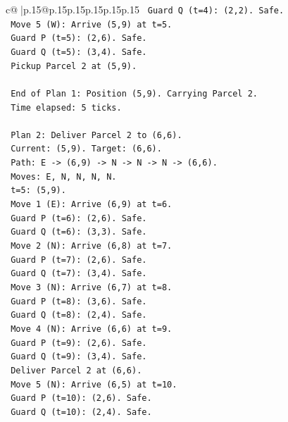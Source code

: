 \documentclass{article}
\begin{document}
{\begin{supertabular}{c@{$\;$}|p{.15\linewidth}@{}p{.15\linewidth}p{.15\linewidth}p{.15\linewidth}p{.15\linewidth}p{.15\linewidth}}
{{{\texttt{         Guard Q (t=4): (2,2). Safe.} \\
\texttt{      Move 5 (W): Arrive (5,9) at t=5.} \\
\texttt{         Guard P (t=5): (2,6). Safe.} \\
\texttt{         Guard Q (t=5): (3,4). Safe.} \\
\texttt{         Pickup Parcel 2 at (5,9).} \\
\\ 
\texttt{      End of Plan 1: Position (5,9). Carrying Parcel 2.} \\
\texttt{      Time elapsed: 5 ticks.} \\
\\ 
\texttt{      Plan 2: Deliver Parcel 2 to (6,6).} \\
\texttt{      Current: (5,9). Target: (6,6).} \\
\texttt{      Path: E {-}> (6,9) {-}> N {-}> N {-}> N {-}> (6,6).} \\
\texttt{      Moves: E, N, N, N, N.} \\
\texttt{      t=5: (5,9).} \\
\texttt{      Move 1 (E): Arrive (6,9) at t=6.} \\
\texttt{         Guard P (t=6): (2,6). Safe.} \\
\texttt{         Guard Q (t=6): (3,3). Safe.} \\
\texttt{      Move 2 (N): Arrive (6,8) at t=7.} \\
\texttt{         Guard P (t=7): (2,6). Safe.} \\
\texttt{         Guard Q (t=7): (3,4). Safe.} \\
\texttt{      Move 3 (N): Arrive (6,7) at t=8.} \\
\texttt{         Guard P (t=8): (3,6). Safe.} \\
\texttt{         Guard Q (t=8): (2,4). Safe.} \\
\texttt{      Move 4 (N): Arrive (6,6) at t=9.} \\
\texttt{         Guard P (t=9): (2,6). Safe.} \\
\texttt{         Guard Q (t=9): (3,4). Safe.} \\
\texttt{         Deliver Parcel 2 at (6,6).} \\
\texttt{      Move 5 (N): Arrive (6,5) at t=10.} \\
\texttt{         Guard P (t=10): (2,6). Safe.} \\
\texttt{         Guard Q (t=10): (2,4). Safe.} \\
}}}
\end{supertabular}}
\end{document}
